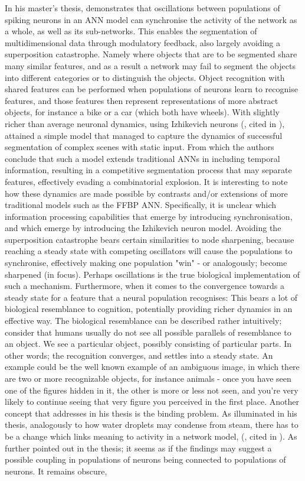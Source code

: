 In his master's thesis, \cite{Solbakken2009} demonstrates that oscillations between populations of spiking neurons in an ANN model can synchronise the activity of the network as a whole, as well as its sub-networks. This enables the segmentation of multidimensional data through modulatory feedback, also largely avoiding a superposition catastrophe. Namely where objects that are to be segmented share many similar features, and as a result a network may fail to segment the objects into different categories or to distinguish the objects. Object recognition with shared features can be performed when populations of neurons learn to recognise features, and those features then represent representations of more abstract objects, for instance a bike or a car (which both have wheels). With slightly richer than average neuronal dynamics, using Izhikevich neurons (\cite{Izhikevich2003}, cited in \cite{Solbakken2009}), \cite{Solbakken2009} attained a simple model that managed to capture the dynamics of successful segmentation of complex scenes with static input. From which the authors conclude that such a model extends traditional ANNs in including temporal information, resulting in a competitive segmentation process that may separate features, effectively evading a combinatorial explosion. It is interesting to note how these dynamics are made possible by contrasts and/or extensions of more traditional models such as the FFBP ANN. Specifically, it is unclear which information processing capabilities that emerge by introducing synchronisation, and which emerge by introducing the Izhikevich neuron model. Avoiding the superposition catastrophe bears certain similarities to node sharpening, because reaching a steady state with competing oscillators will cause the populations to synchronise, effectively making one population "win" - or analogously; become sharpened (in focus). Perhaps oscillations is the true biological implementation of such a mechanism. Furthermore, when it comes to the convergence towards a steady state for a feature that a neural population recognises: This bears a lot of biological resemblance to cognition, potentially providing richer dynamics in an effective way. The biological resemblance can be described rather intuitively; consider that humans usually do not see all possible parallels of resemblance to an object. We see a particular object, possibly consisting of particular parts. In other words; the recognition converges, and settles into a steady state. An example could be the well known example of an ambiguous image, in which there are two or more recognizable objects, for instance animals - once you have seen one of the figures hidden in it, the other is more or less not seen, and you're very likely to continue seeing that very figure you perceived in the first place. Another concept that \cite{Solbakken2009} addresses in his thesis is the binding problem. As illuminated in his thesis, analogously to how water droplets may condense from steam,  there has to be a change which links meaning to activity in a network model, (\cite{Freeman2003}, cited in \cite{Solbakken2009}). As further pointed out in the thesis; it seems as if the findings may suggest a possible coupling in populations of neurons being connected to populations of neurons. It remains obscure, 